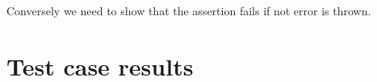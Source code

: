 \startConTest
\begingroup
  \mockErrMessage
\endgroup
\stopConTest
\stopTestCase


Conversely we need to show that the \type{\assertErrorThrown} assertion 
fails if not error is thrown. 

\startConTest
\begingroup
  \mockErrMessage
  \stopAssertShouldFail
\endgroup
\stopConTest
\stopTestCase

\stopTestSuite

\section{Test case results}

\reportMkIVStats

\reportFailures

\stopchapter
